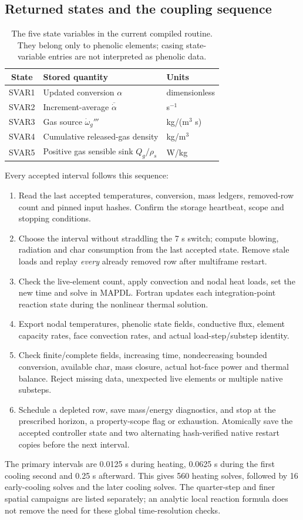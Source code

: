 \subsection{Returned states and the coupling sequence}
\begin{table}[H]\centering\small
\begin{tabular}{cll}\toprule
State & Stored quantity & Units\\\midrule
SVAR1 & Updated conversion $\alpha$ & dimensionless\\
SVAR2 & Increment-average $\overline{\dot\alpha}$ & s$^{-1}$\\
SVAR3 & Gas source $\dot\omega_g'''$ & kg/(m$^3$ s)\\
SVAR4 & Cumulative released-gas density & kg/m$^3$\\
SVAR5 & Positive gas sensible sink $Q_g/\rho_s$ & W/kg\\\bottomrule
\end{tabular}\caption{The five state variables in the current compiled routine. They belong only to phenolic elements; casing state-variable entries are not interpreted as phenolic data.}\end{table}
Every accepted interval follows this sequence:
\begin{enumerate}[leftmargin=*,itemsep=2pt]
\item Read the last accepted temperatures, conversion, mass ledgers, removed-row count and pinned input hashes. Confirm the storage heartbeat, scope and stopping conditions.
\item Choose the interval without straddling the 7 s switch; compute blowing, radiation and char consumption from the last accepted state. Remove stale loads and replay \emph{every} already removed row after multiframe restart.
\item Check the live-element count, apply convection and nodal heat loads, set the new time and solve in MAPDL. Fortran updates each integration-point reaction state during the nonlinear thermal solution.
\item Export nodal temperatures, phenolic state fields, conductive flux, element capacity rates, face convection rates, and actual load-step/substep identity.
\item Check finite/complete fields, increasing time, nondecreasing bounded conversion, available char, mass closure, actual hot-face power and thermal balance. Reject missing data, unexpected live elements or multiple native substeps.
\item Schedule a depleted row, save mass/energy diagnostics, and stop at the prescribed horizon, a property-scope flag or exhaustion. Atomically save the accepted controller state and two alternating hash-verified native restart copies before the next interval.
\end{enumerate}
The primary intervals are 0.0125 s during heating, 0.0625 s during the first cooling second and 0.25 s afterward. This gives 560 heating solves, followed by 16 early-cooling solves and the later cooling solves. The quarter-step and finer spatial campaigns are listed separately; an analytic local reaction formula does not remove the need for these global time-resolution checks.

